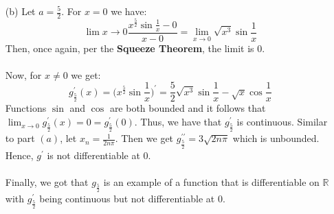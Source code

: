 \documentclass[11pt]{article}
\newcommand{\reals}{\mathbb{R}}
\begin{document}
\begin{itemize}
\begin{itemize}
            \item[(b)]
                Let $a = \frac{5}{2}$. For $x = 0$ we have:
                \begin{equation*}
                    \lim{x \to 0}\frac{x^\frac{5}{2}\sin{\frac{1}{x}} - 0}{x - 0}
                        = \lim_{x \to 0}\sqrt{x^3}\sin{\frac{1}{x}}
                \end{equation*}
                Then, once again, per the \textbf{Squeeze Theorem}, the limit
                is $0$.
                \\
                \\
                Now, for $x \neq 0$ we get:
                \begin{equation*}
                    g_{\frac{5}{2}}^\prime(x) = \Big(x^\frac{5}{2}\sin{\frac{1}{x}}\Big)^\prime
                                              = \frac{5}{2}\sqrt{x^3}\sin{\frac{1}{x}} - \sqrt{x}\cos{\frac{1}{x}}
                \end{equation*}
                Functions $\sin$ and $\cos$ are both bounded and it follows
                that $\lim_{x \to 0}g_{\frac{5}{2}}^\prime(x) = 0 =
                g_\frac{5}{2}^\prime(0)$. Thus, we have that
                $g_{\frac{5}{2}}^\prime$ is continuous. Similar to part $(a)$,
                let $x_n = \frac{1}{2n\pi}$. Then we get
                $g_{\frac{5}{2}}^{\prime\prime} = 3\sqrt{2n\pi}$ which is
                unbounded. Hence, $g^\prime$ is not differentiable at $0$.
                \\
                \\
                Finally, we got that $g_{\frac{5}{2}}$ is an example of a
                function that is differentiable on $\reals$ with
                $g_{\frac{5}{2}}^\prime$ being continuous but not
                differentiable at $0$.


\end{itemize}
\end{itemize}
\end{document}
